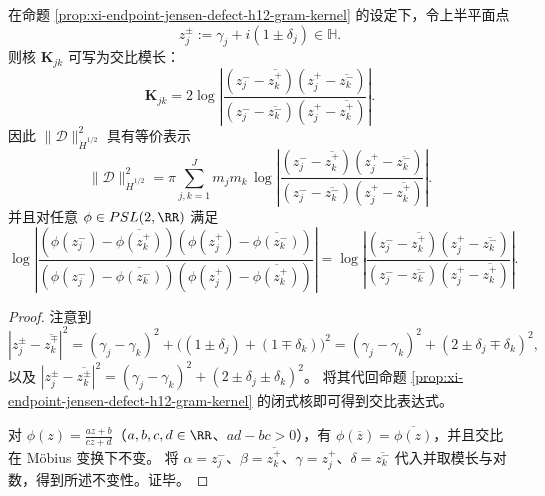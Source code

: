 \begin{proposition}\label{prop:xi-endpoint-jensen-defect-h12-crossratio-mobius}
在命题 \ref{prop:xi-endpoint-jensen-defect-h12-gram-kernel} 的设定下，令上半平面点
\[
z_j^\pm:=\gamma_j+i(1\pm\delta_j)\in\mathbb H.
\]
则核 \(\mathbf K_{jk}\) 可写为交比模长：
\[
\mathbf K_{jk}
=2\log\left|
\frac{(z_j^- - \overline{z_k^+})(z_j^+ - \overline{z_k^-})}{(z_j^- - \overline{z_k^-})(z_j^+ - \overline{z_k^+})}
\right|.
\]
因此 \(\|\mathcal D\|_{\dot H^{1/2}}^2\) 具有等价表示
\[
\|\mathcal D\|_{\dot H^{1/2}}^2
=\pi\sum_{j,k=1}^{J} m_jm_k\,
\log\left|
\frac{(z_j^- - \overline{z_k^+})(z_j^+ - \overline{z_k^-})}{(z_j^- - \overline{z_k^-})(z_j^+ - \overline{z_k^+})}
\right|.
\]
并且对任意 \(\phi\in PSL(2,\RR)\) 满足
\[
\log\left|
\frac{(\phi(z_j^-)-\overline{\phi(z_k^+)})(\phi(z_j^+)-\overline{\phi(z_k^- )})}{(\phi(z_j^-)-\overline{\phi(z_k^-)})(\phi(z_j^+)-\overline{\phi(z_k^+)})}
\right|
=
\log\left|
\frac{(z_j^- - \overline{z_k^+})(z_j^+ - \overline{z_k^-})}{(z_j^- - \overline{z_k^-})(z_j^+ - \overline{z_k^+})}
\right|.
\]
\end{proposition}
\begin{proof}
注意到
\[
|z_j^\pm-\overline{z_k^\mp}|^2
=(\gamma_j-\gamma_k)^2+\bigl((1\pm\delta_j)+(1\mp\delta_k)\bigr)^2
=(\gamma_j-\gamma_k)^2+(2\pm\delta_j\mp\delta_k)^2,
\]
以及
\(
|z_j^\pm-\overline{z_k^\pm}|^2=(\gamma_j-\gamma_k)^2+(2\pm\delta_j\pm\delta_k)^2
\)。
将其代回命题 \ref{prop:xi-endpoint-jensen-defect-h12-gram-kernel} 的闭式核即可得到交比表达式。
\par
对 \(\phi(z)=\frac{az+b}{cz+d}\)（\(a,b,c,d\in\RR\)、\(ad-bc>0\)），有 \(\phi(\overline z)=\overline{\phi(z)}\)，并且交比在 Möbius 变换下不变。
将
\(\alpha=z_j^-\)、\(\beta=\overline{z_k^+}\)、\(\gamma=z_j^+\)、\(\delta=\overline{z_k^-}\)
代入并取模长与对数，得到所述不变性。证毕。
\end{proof}

